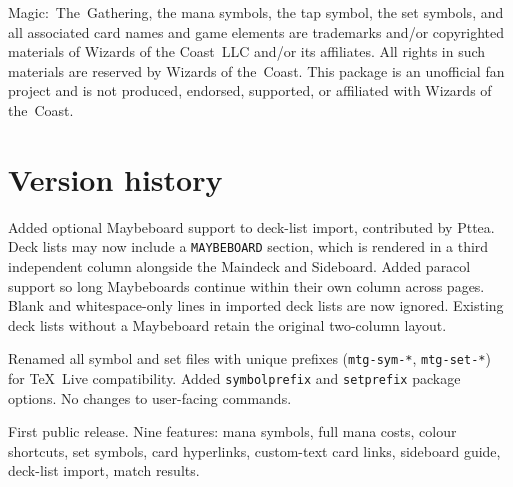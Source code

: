 \documentclass[a4paper,11pt]{article}
\newcommand{\pkg}[1]{\textsf{#1}}
\newcommand{\opt}[1]{\texttt{#1}}
\newcommand{\file}[1]{\texttt{#1}}
\begin{document}
Magic:~The~Gathering, the mana symbols, the tap symbol, the set
symbols, and all associated card names and game elements are
trademarks and/or copyrighted materials of Wizards of the
Coast~LLC and/or its affiliates.  All rights in such materials
are reserved by Wizards of the~Coast.  This package is an
unofficial fan project and is not produced, endorsed, supported,
or affiliated with Wizards of the~Coast.

\section{Version history}

\begin{description}[font=\normalfont\ttfamily\bfseries,
                     itemsep=4pt]
  \item[v1.2 (2026-09-04)]
    Added optional Maybeboard support to deck-list import,
    contributed by Pttea.
    Deck lists may now include a \texttt{MAYBEBOARD} section,
    which is rendered in a third independent column alongside
    the Maindeck and Sideboard.  Added \pkg{paracol} support so
    long Maybeboards continue within their own column across
    pages.  Blank and whitespace-only lines in imported deck
    lists are now ignored.  Existing deck lists without a
    Maybeboard retain the original two-column layout.

  \item[v1.1 (2026-03-21)]
    Renamed all symbol and set files with unique prefixes
    (\file{mtg-sym-*}, \file{mtg-set-*}) for TeX~Live
    compatibility.  Added \opt{symbolprefix} and
    \opt{setprefix} package options.
    No changes to user-facing commands.

  \item[v1.0 (2026-03-15)]
    First public release.  Nine features: mana symbols, full
    mana costs, colour shortcuts, set symbols, card hyperlinks,
    custom-text card links, sideboard guide, deck-list import,
    match results.
\end{description}
\end{document}
